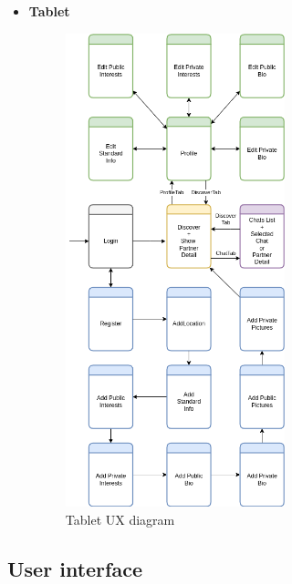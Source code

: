 \documentclass{article}
\begin{document}
\begin{itemize}
	\newpage
	\item \bf Tablet
		\begin{figure}[!htb]
			\centering
			\includegraphics[width=0.6\textwidth]{assets/images/UX-tablet.drawio.png}
			\caption{Tablet UX diagram}
		\end{figure}

\end{itemize} 

\clearpage
\subsection{User interface}
\end{document}
